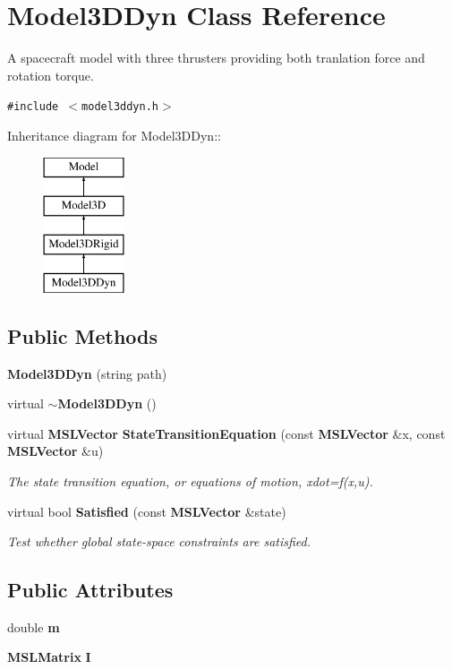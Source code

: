 \section{Model3DDyn  Class Reference}
\label{classModel3DDyn}
A spacecraft model with three thrusters providing both tranlation force and rotation torque. 


{\tt \#include $<$model3ddyn.h$>$}

Inheritance diagram for Model3DDyn::\begin{figure}[H]
\begin{center}
\leavevmode
\includegraphics[height=4cm]{classModel3DDyn}
\end{center}
\end{figure}
\subsection*{Public Methods}
\begin{CompactItemize}
\item 
{\bf Model3DDyn} (string path)
\item 
virtual {\bf $\sim$Model3DDyn} ()
\item 
virtual {\bf MSLVector} {\bf State\-Transition\-Equation} (const {\bf MSLVector} \&x, const {\bf MSLVector} \&u)
\begin{CompactList}\small\item\em The state transition equation, or equations of motion, xdot=f(x,u).\item\end{CompactList}\item 
virtual bool {\bf Satisfied} (const {\bf MSLVector} \&state)
\begin{CompactList}\small\item\em Test whether global state-space constraints are satisfied.\item\end{CompactList}\end{CompactItemize}
\subsection*{Public Attributes}
\begin{CompactItemize}
\item 
double {\bf m}
\item 
{\bf MSLMatrix} {\bf I}
\end{CompactItemize}


